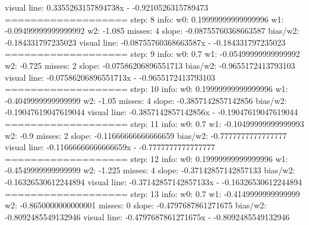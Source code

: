 \documentclass[11pt]{article}
\begin{document}
\begin{enumerate}
	visual line: 0.3355263157894738x - -0.9210526315789473 \newline
=================== \newline
step: 8 info: w0: 0.19999999999999996 w1: -0.09499999999999992 w2: -1.085 misses: 4 \newline
		slope: -0.08755760368663587 bias/w2: -0.184331797235023 \newline
	visual line: -0.08755760368663587x - -0.184331797235023 \newline
=================== \newline
step: 9 info: w0: 0.7 w1: -0.05499999999999992 w2: -0.725 misses: 2 \newline
		slope: -0.07586206896551713 bias/w2: -0.9655172413793103 \newline
	visual line: -0.07586206896551713x - -0.9655172413793103 \newline
=================== \newline
step: 10 info: w0: 0.19999999999999996 w1: -0.4049999999999999 w2: -1.05 misses: 4 \newline
		slope: -0.3857142857142856 bias/w2: -0.19047619047619044 \newline
	visual line: -0.3857142857142856x - -0.19047619047619044 \newline
=================== \newline
step: 11 info: w0: 0.7 w1: -0.10499999999999993 w2: -0.9 misses: 2 \newline
		slope: -0.11666666666666659 bias/w2: -0.7777777777777777 \newline
	visual line: -0.11666666666666659x - -0.7777777777777777 \newline
=================== \newline
step: 12 info: w0: 0.19999999999999996 w1: -0.4549999999999999 w2: -1.225 misses: 4 \newline
		slope: -0.37142857142857133 bias/w2: -0.16326530612244894 \newline
	visual line: -0.37142857142857133x - -0.16326530612244894 \newline
=================== \newline
step: 13 info: w0: 0.7 w1: -0.4149999999999999 w2: -0.8650000000000001 misses: 0 \newline
		slope: -0.4797687861271675 bias/w2: -0.8092485549132946 \newline
	visual line: -0.4797687861271675x - -0.8092485549132946 \newline
\end{enumerate}
\end{document}
